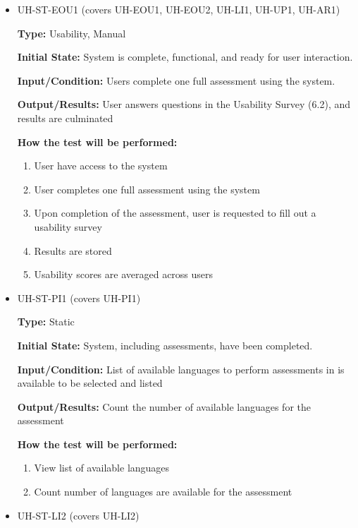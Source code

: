 \documentclass[12pt, titlepage]{article}
\begin{document}
\begin{itemize}
  \item UH-ST-EOU1 (covers UH-EOU1, UH-EOU2, UH-LI1, UH-UP1, UH-AR1)
  \begin{mdframed}[linewidth=0.5mm]
      \textbf{Type:} Usability, Manual\par
      \textbf{Initial State:} System is complete, functional, and ready for user interaction. \par
      \textbf{Input/Condition:} Users complete one full assessment using the system. \par
      \textbf{Output/Results:} User answers questions in the Usability Survey (6.2), and results are culminated \par
      \textbf{How the test will be performed:}
      \begin{enumerate}[noitemsep]
        \item User have access to the system
        \item User completes one full assessment using the system
        \item Upon completion of the assessment, user is requested to fill out a usability survey
        \item Results are stored
        \item Usability scores are averaged across users
      \end{enumerate}
  \end{mdframed}
  \item UH-ST-PI1 (covers UH-PI1)
  \begin{mdframed}[linewidth=0.5mm]
      \textbf{Type:} Static \par
      \textbf{Initial State:} System, including assessments, have been completed. \par
      \textbf{Input/Condition:} List of available languages to perform assessments in is available to be selected and listed\par
      \textbf{Output/Results:} Count the number of available languages for the assessment \par
      \textbf{How the test will be performed:}
      \begin{enumerate}[noitemsep]
        \item View list of available languages
        \item Count number of languages are available for the assessment
      \end{enumerate}
  \end{mdframed}
  \item UH-ST-LI2 (covers UH-LI2)

\end{itemize}
\end{document}
